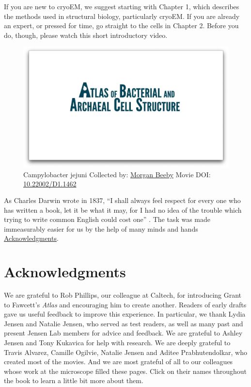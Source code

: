 \documentclass[]{tufte-book}
\begin{document}
If you are new to cryoEM, we suggest starting with Chapter 1, which
describes the methods used in structural biology, particularly cryoEM.
If you are already an expert, or pressed for time, go straight to the
cells in Chapter 2. Before you do, though, please watch this short
introductory video.





\begin{figure}
\includegraphics{movie_stills/0_1} \caption[Campylobacter jejuni Collected by:
\protect\hyperlink{morgan_beeby}{Morgan Beeby} Movie DOI:
\href{https://doi.org/10.22002/D1.1462}{10.22002/D1.1462}]{Campylobacter jejuni Collected by:
\protect\hyperlink{morgan_beeby}{Morgan Beeby} Movie DOI:
\href{https://doi.org/10.22002/D1.1462}{10.22002/D1.1462}}\label{fig:0-1}
\end{figure}

As Charles Darwin wrote in 1837, ``I shall always feel respect for every
one who has written a book, let it be what it may, for I had no idea of
the trouble which trying to write common English could cost one''
\citep{darwin1888}. The task was made immeasurably easier for us by the
help of many minds and hands
\protect\hyperlink{acknowledgments}{Acknowledgments}.

\hypertarget{acknowledgments}{\section*{Acknowledgments}\label{acknowledgments}}

We are grateful to Rob Phillips, our colleague at Caltech, for
introducing Grant to Fawcett's \emph{Atlas} and encouraging him to
create another. Readers of early drafts gave us useful feedback to
improve this experience. In particular, we thank Lydia Jensen and
Natalie Jensen, who served as test readers, as well as many past and
present Jensen Lab members for advice and feedback. We are grateful to
Ashley Jensen and Tony Kukavica for help with research. We are deeply
grateful to Travis Alvarez, Camille Ogilvie, Natalie Jensen and Aditee
Prabhutendolkar, who created most of the movies. And we are most
grateful of all to our colleagues whose work at the microscope filled
these pages. Click on their names throughout the book to learn a little
bit more about them.
\end{document}
